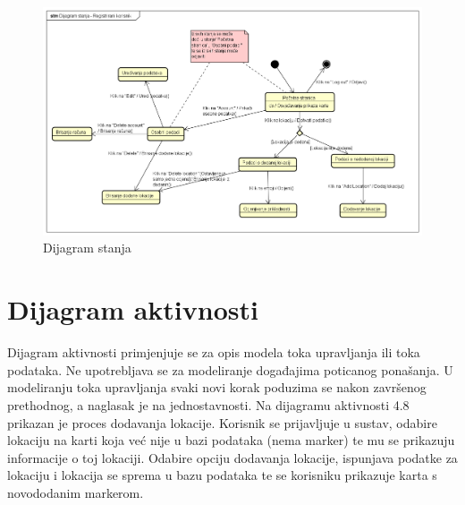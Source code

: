 			\begin{figure}[H]
			\includegraphics[scale=0.4]{slike/DijagramStanja.png}
			\centering
			\caption{Dijagram stanja}
			\label{fig:promjene}
				\end{figure}

         \section{Dijagram aktivnosti}
         
		 Dijagram aktivnosti primjenjuje se za opis modela toka upravljanja ili toka podataka. Ne upotrebljava se za modeliranje događajima poticanog ponašanja. U modeliranju toka upravljanja svaki novi korak poduzima se nakon završenog prethodnog, a naglasak je na jednostavnosti. Na dijagramu aktivnosti 4.8 prikazan je proces dodavanja lokacije. Korisnik se prijavljuje u sustav, odabire lokaciju na karti koja već nije u bazi podataka (nema marker)  te mu se prikazuju informacije o toj lokaciji.  Odabire opciju dodavanja lokacije, ispunjava podatke za lokaciju i lokacija se sprema u bazu podataka te se korisniku prikazuje karta s novododanim markerom. 
         
